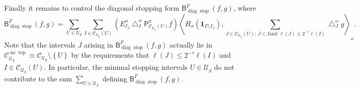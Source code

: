 \documentclass{amsart}%
\theoremstyle{plain}
\numberwithin{equation}{section}
\begin{document}
Finally it remains to control the diagonal stopping form $\mathsf{B}%
_{\operatorname{diag}\operatorname*{stop}}^{F}\left(  f,g\right)  $, where%
\[
\mathsf{B}_{\operatorname{diag}\operatorname*{stop}}^{F}\left(  f,g\right)
=\sum_{U\in\mathcal{U}_{g}}\sum_{I\in\mathcal{C}_{\mathcal{U}_{g}}\left(
U\right)  }\left(  E_{I_{J}}^{\sigma}\bigtriangleup_{I}^{\sigma}%
\mathsf{P}_{\mathcal{C}_{\mathcal{U}_{g}}\left(  U\right)  }^{\sigma}f\right)
\left\langle H_{\sigma}\left(  \mathbf{1}_{F\setminus I_{J}}\right)
,\sum_{J\in\mathcal{C}_{\mathcal{U}_{g}}\left(  U\right)  :\ J\subset I\text{
and }\ell\left(  J\right)  \leq2^{-\tau}\ell\left(  I\right)  }\bigtriangleup
_{J}^{\omega}g\right\rangle _{\omega}.
\]
Note that the intervals $J$ arising in $\mathsf{B}_{\operatorname{diag}%
\operatorname*{stop}}^{F}\left(  f,g\right)  $ actually lie in $\mathcal{C}%
_{\mathcal{U}_{g}}^{\operatorname*{no}\operatorname{top}}\equiv\mathcal{C}%
_{\mathcal{U}_{g}}\setminus\left\{  U\right\}  $ by the requirements that
$\ell\left(  J\right)  \leq2^{-\tau}\ell\left(  I\right)  $ and $I\in
\mathcal{C}_{\mathcal{U}_{g}}\left(  U\right)  $. In particular, the minimal
stopping intervals $U\in\mathcal{U}_{g}$ do not contribute to the sum
$\sum_{U\in\mathcal{U}_{g}}$ defining $\mathsf{B}_{\operatorname{diag}%
\operatorname*{stop}}^{F}\left(  f,g\right)  $.
\end{document}
